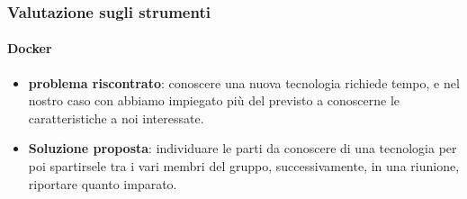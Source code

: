     \subsubsection{Valutazione sugli strumenti}
    
        \paragraph{Docker}
            \begin{itemize}
                \item \textbf{problema riscontrato}: conoscere una nuova tecnologia richiede tempo, e nel nostro caso con  abbiamo impiegato più del previsto a conoscerne le caratteristiche a noi interessate.
                \item \textbf{Soluzione proposta}: individuare le parti da conoscere di una tecnologia per poi spartirsele tra i vari membri del gruppo, successivamente, in una riunione, riportare quanto imparato.
            \end{itemize}
    
    
		
		
		
